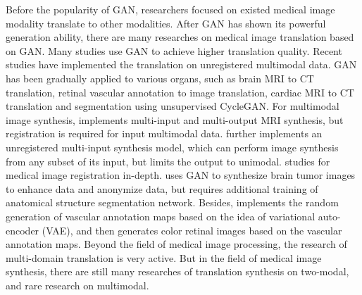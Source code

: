 \documentclass[letterpaper]{article} %
\begin{document}
Before the popularity of GAN, researchers focused on existed medical image modality translate to other modalities\cite{22burgos2015robust,33huang2017simultaneous,34vemulapalli2015unsupervised,36vannguyen2015crossdomain}. After GAN has shown its powerful generation ability, there are many researches on medical image translation based on GAN\cite{2zhang2018translating,20nie2017medical,35osokin2017gans,36vannguyen2015crossdomain,40kamnitsas2017unsupervised}. Many studies use GAN to achieve higher translation quality\cite{1zhao2018modular,5liang2018generative,6zhu2017unpaired,13choi2018stargan:}. Recent studies have implemented the translation on unregistered multimodal data\cite{2zhang2018translating,85joyce2017robust}.
GAN has been gradually applied to various organs, such as brain MRI to CT translation\cite{20nie2017medical,40kamnitsas2017unsupervised}, retinal vascular annotation to image translation\cite{41costa2017towards}, cardiac MRI to CT translation and segmentation using unsupervised CycleGAN\cite{6zhu2017unpaired,20nie2017medical}.
For multimodal image synthesis, \cite{84chartsias2018multimodal} implements multi-input and multi-output MRI synthesis, but registration is required for input multimodal data. \cite{85joyce2017robust} further implements an unregistered multi-input synthesis model, which can perform image synthesis from any subset of its input, but limits the output to unimodal. \cite{66Miao2018dilated} studies for medical image registration in-depth. \cite{4shin2018medical} uses GAN to synthesize brain tumor images to enhance data and anonymize data, but requires additional training of anatomical structure segmentation network.
Besides,\cite{41costa2017towards} implements the random generation of vascular annotation maps based on the idea of variational auto-encoder (VAE)\cite{87kingma2014auto-encoding}, and then generates color retinal images based on the vascular annotation maps.
Beyond the field of medical image processing, the research of multi-domain translation is very active\cite{1zhao2018modular,5liang2018generative,13choi2018stargan:,27isola2017image-to-image}.
But in the field of medical image synthesis, there are still many researches of translation synthesis on two-modal\cite{2zhang2018translating,20nie2017medical,22burgos2015robust,34vemulapalli2015unsupervised,35osokin2017gans,36vannguyen2015crossdomain,40kamnitsas2017unsupervised}, and rare research on multimodal\cite{84chartsias2018multimodal,85joyce2017robust,4shin2018medical}.
\end{document}
